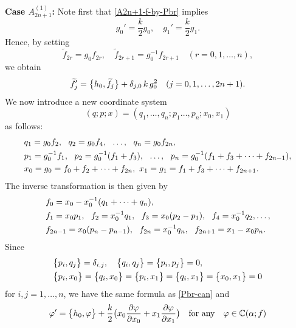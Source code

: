 \medskip\noindent
{\bf Case $A^{(1)}_{2n+1}$:}\quad
Note first that \eqref{A2n+1-f-by-Pbr} implies
\begin{equation}
g_0'=\frac{k}{2} g_0,\quad g_1'=\frac{k}{2} g_1. 
\end{equation}
Hence, by setting
\begin{equation}
\widetilde{f}_{2r}=g_0 f_{2r}, \quad \widetilde{f}_{2r+1}=g_0^{-1} f_{2r+1}
\quad(r=0,1,\ldots,n), 
\end{equation}
we obtain
\begin{equation}
\widetilde{f}_j' = \big\{{ h_0,\widetilde{f}_j }\big\} + \delta_{j,0}\, k \, g_0^2
\quad(j=0,1,\ldots,2n+1).  
\end{equation}
We now introduce a new coordinate system 
\begin{equation}
(q;p;x)=(q_1,\ldots,q_n;p_1\ldots,p_n;x_0,x_1)
\end{equation}
 as follows:
\begin{equation}
\begin{align}
&q_1=g_0 f_2, \ \ q_2=g_0 f_4, \ \  \ldots, \ \ q_n=g_0 f_{2n},\\ 
&p_1=g_0^{-1}f_1, \ \ p_2=g_0^{-1}(f_1+f_3),\ \  \ldots,\ \  
p_n=g_0^{-1}(f_1+f_3+\cdots+f_{2n-1}),\notag\\
&x_0=g_0=f_0+f_2+\cdots+f_{2n},\ x_1=g_1=f_1+f_3+\cdots+f_{2n+1}. \notag
\end{align}
\end{equation}
The inverse transformation is then given by
\begin{equation}\Label{f-in-qp-2n+1}
\begin{align}
&f_0=x_0-x_0^{-1}(q_1+\cdots+q_n),\\
&f_1=x_0 p_1,\ \  f_2=x_0^{-1} q_1, \ \ f_3=x_0(p_2-p_1), 
\ \ f_4=x_0^{-1}q_2,\ldots,\notag\\
&f_{2n-1}=x_0(p_n-p_{n-1}), \ \ f_{2n}=x_0^{-1}q_n,
\ \ f_{2n+1}=x_1-x_0 p_n.\notag
\end{align}
\end{equation}
Since
\begin{equation}
\begin{align}
&\big\{{ p_i,q_j }\big\}=\delta_{i,j},\quad 
\big\{{ q_i,q_j }\big\}=\big\{{ p_i,p_j }\big\}=0,\\
&\big\{{ p_i,x_0 }\big\}=\big\{{ q_i,x_0 }\big\}=\big\{{ p_i,x_1 }\big\}=\big\{{ q_i,x_1 }\big\}
=\big\{{ x_0,x_1 }\big\}=0
\notag
\end{align}
\end{equation}
for $i,j=1,\ldots,n$, we have the same formula as \eqref{Pbr-can} and 
\begin{equation}
\varphi'=\big\{{ h_0,\varphi }\big\}+\frac{k}{2}\big(
x_0\frac{\partial \varphi}{\partial x_0}+x_1\frac{\partial \varphi}{\partial x_1}\big) 
\quad\text{for any}\quad \varphi\in{\Bbb C}(\alpha;f)
\end{equation}
